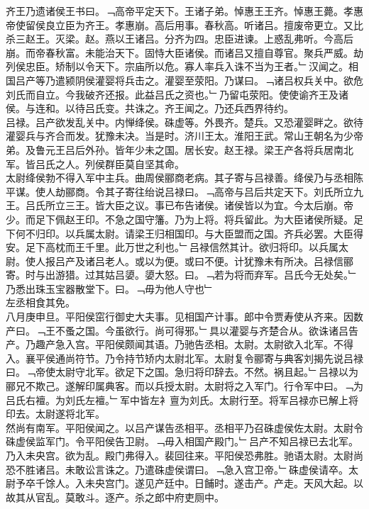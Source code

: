\documentclass{zhvt-classic}
\begin{document}
\hspace*{2em}齐王乃遗诸侯王书曰。﹁高帝平定天下。王诸子弟。悼惠王王齐。悼惠王薨。孝惠帝使留侯良立臣为齐王。孝惠崩。高后用事。春秋高。听诸吕。擅废帝更立。又比杀三赵王。灭梁。赵。燕以王诸吕。分齐为四。忠臣进谏。上惑乱弗听。今高后崩。而帝春秋富。未能治天下。固恃大臣诸侯。而诸吕又擅自尊官。聚兵严威。劫列侯忠臣。矫制以令天下。宗庙所以危。寡人率兵入诛不当为王者。﹂汉闻之。相国吕产等乃遣颍阴侯灌婴将兵击之。灌婴至荥阳。乃谋曰。﹁诸吕权兵关中。欲危刘氏而自立。今我破齐还报。此益吕氏之资也。﹂乃留屯荥阳。使使谕齐王及诸侯。与连和。以待吕氏变。共诛之。齐王闻之。乃还兵西界待约。\\
\hspace*{2em}吕禄。吕产欲发乱关中。内惮绛侯。硃虚等。外畏齐。楚兵。又恐灌婴畔之。欲待灌婴兵与齐合而发。犹豫未决。当是时。济川王太。淮阳王武。常山王朝名为少帝弟。及鲁元王吕后外孙。皆年少未之国。居长安。赵王禄。梁王产各将兵居南北军。皆吕氏之人。列侯群臣莫自坚其命。\\
\hspace*{2em}太尉绛侯勃不得入军中主兵。曲周侯郦商老病。其子寄与吕禄善。绛侯乃与丞相陈平谋。使人劫郦商。令其子寄往绐说吕禄曰。﹁高帝与吕后共定天下。刘氏所立九王。吕氏所立三王。皆大臣之议。事已布告诸侯。诸侯皆以为宜。今太后崩。帝少。而足下佩赵王印。不急之国守籓。乃为上将。将兵留此。为大臣诸侯所疑。足下何不归印。以兵属太尉。请梁王归相国印。与大臣盟而之国。齐兵必罢。大臣得安。足下高枕而王千里。此万世之利也。﹂吕禄信然其计。欲归将印。以兵属太尉。使人报吕产及诸吕老人。或以为便。或曰不便。计犹豫未有所决。吕禄信郦寄。时与出游猎。过其姑吕嬃。嬃大怒。曰。﹁若为将而弃军。吕氏今无处矣。﹂乃悉出珠玉宝器散堂下。曰。﹁毋为他人守也﹂\\
\hspace*{2em}左丞相食其免。\\
\hspace*{2em}八月庚申旦。平阳侯窋行御史大夫事。见相国产计事。郎中令贾寿使从齐来。因数产曰。﹁王不蚤之国。今虽欲行。尚可得邪。﹂具以灌婴与齐楚合从。欲诛诸吕告产。乃趣产急入宫。平阳侯颇闻其语。乃驰告丞相。太尉。太尉欲入北军。不得入。襄平侯通尚符节。乃令持节矫内太尉北军。太尉复令郦寄与典客刘揭先说吕禄曰。﹁帝使太尉守北军。欲足下之国。急归将印辞去。不然。祸且起。﹂吕禄以为郦兄不欺己。遂解印属典客。而以兵授太尉。太尉将之入军门。行令军中曰。﹁为吕氏右襢。为刘氏左襢。﹂军中皆左衤亶为刘氏。太尉行至。将军吕禄亦已解上将印去。太尉遂将北军。\\
\hspace*{2em}然尚有南军。平阳侯闻之。以吕产谋告丞相平。丞相平乃召硃虚侯佐太尉。太尉令硃虚侯监军门。令平阳侯告卫尉。﹁毋入相国产殿门。﹂吕产不知吕禄已去北军。乃入未央宫。欲为乱。殿门弗得入。裴回往来。平阳侯恐弗胜。驰语太尉。太尉尚恐不胜诸吕。未敢讼言诛之。乃遣硃虚侯谓曰。﹁急入宫卫帝。﹂硃虚侯请卒。太尉予卒千馀人。入未央宫门。遂见产廷中。日餔时。遂击产。产走。天风大起。以故其从官乱。莫敢斗。逐产。杀之郎中府吏厕中。\\
\end{document}
